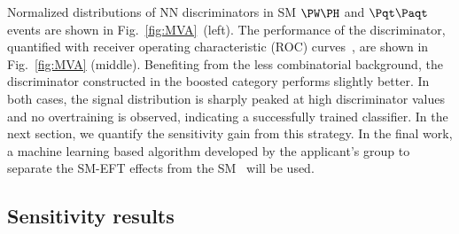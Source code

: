 \documentclass[a4paper,11pt]{article}
\newcommand{\Pt}{{{\Pqt}}\xspace}
\newcommand{\PAt}{{{{\Paqt}}}\xspace}
\begin{document}
Normalized distributions of NN discriminators in SM $\PW\PH$ and $\Pt\PAt$ events are shown in Fig.~\ref{fig:MVA}~(left). 
The performance of the discriminator, quantified with receiver operating characteristic (ROC) curves~\cite{FAWCETT2006861}, are shown in Fig.~\ref{fig:MVA} (middle). 
Benefiting from the less combinatorial background,
the discriminator constructed in the boosted category performs slightly better. 
In both cases, the signal distribution is sharply peaked at high discriminator values and no overtraining is observed, indicating a successfully trained classifier.
In the next section, we quantify the sensitivity gain from this strategy.
In the final work, a machine learning based algorithm developed by the applicant's group to separate the SM-EFT effects from the SM~\cite{Chatterjee:2021nms} will be used.

\subsection{Sensitivity results}
\end{document}
